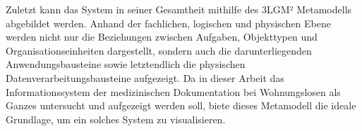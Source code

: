 Zuletzt kann das System in seiner Gesamtheit mithilfe des 3LGM² Metamodells abgebildet werden. Anhand der fachlichen, logischen und physischen Ebene werden nicht nur die Beziehungen zwischen Aufgaben, Objekttypen und Organisationseinheiten dargestellt, sondern auch die darunterliegenden Anwendungsbausteine sowie letztendlich die physischen Datenverarbeitungsbausteine aufgezeigt. Da in dieser Arbeit das Informationssystem der medizinischen Dokumentation bei Wohnungslosen als Ganzes untersucht und aufgezeigt werden soll, biete dieses Metamodell die ideale Grundlage, um ein solches System zu visualisieren.

